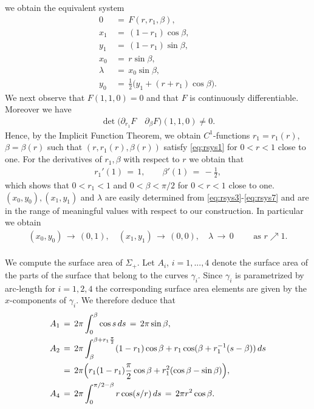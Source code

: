 \documentclass[reqno,makeidx,12pt]{amsart}
\theoremstyle{note}
\theoremstyle{definition}
\begin{document}
we obtain the equivalent system
\begin{align}
  0\,&=\, F(r,r_1,\beta), \label{eq:rsys1}\\
  x_1\,&=\, (1-r_1)\cos\beta, \label{eq:rsys3}\\
  y_1\,&=\, (1-r_1)\sin\beta, \label{eq:rsys4}\\
  x_0\,&=\, r\sin\beta, \label{eq:rsys5}\\
  \lambda\,&=\, x_0\sin\beta, \label{eq:rsys6}\\
  y_0\,&=\,\frac{1}{2}\Big(y_1 + (r+r_1)\cos\beta\Big). \label{eq:rsys7}
\end{align}
We next observe that $F(1,1,0)=0$ and that $F$ is continuously
differentiable. Moreover we have
\begin{gather*}
  \det \Big(\partial_{r_1}F\quad \partial_\beta F\Big)(1,1,0)\neq 0.
\end{gather*}
Hence, by the Implicit Function Theorem, we obtain $C^1$-functions $r_1=r_1(r)$,
$\beta=\beta(r)$ such that $(r,r_1(r),\beta(r))$ satisfy
\eqref{eq:rsys1} for $0<r<1$ close to one. 
For the derivatives of $r_1,\beta$ with respect to $r$ we obtain that
\begin{gather}
   r_1'(1) \,=\, 1, \qquad \beta'(1)\,=\,
   -\frac{1}{2}, \label{eq:prime-r}
\end{gather}
which shows that $0<r_1<1$ and $0<\beta<\pi/2$ for $0<r<1$ close to
one. $(x_0,y_0),(x_1,y_1)$ and $\lambda$ are easily determined from
\eqref{eq:rsys3}-\eqref{eq:rsys7} and are in the range of meaningful
values with respect to our construction. In particular we obtain
\begin{gather}
  (x_0,y_0)\,\to\, (0,1), \quad (x_1,y_1)\,\to\, (0,0), \quad
  \lambda\,\to\, 0 \qquad\text{ as }r\nearrow 1. \label{eq:lim-x0y0}
\end{gather}
{\mbox{}\\\underline{}}
We compute the surface area of $\Sigma_+$. Let $A_i$, $i=1,...,4$ denote 
the surface area of the parts of the surface that belong to the curves
$\gamma_i$.
Since $\gamma_i$ is parametrized by arc-length for $i=1,2,4$ the
corresponding surface area elements are given by the $x$-components of
$\gamma_i$. We therefore deduce that
\begin{align}
  A_1\,&=\, 2\pi \int_0^\beta \cos s\,ds \,=\, 2\pi \sin
  \beta, \label{eq:A1}\\
  A_2\,&=\, 2\pi \int_\beta^{\beta+r_1\frac{\pi}{2}} (1-r_1)\cos\beta +
  r_1\cos(\beta +r_1^{-1}(s-\beta))\, ds \notag\\
  &=\,
  2\pi\Big(r_1(1-r_1)\frac{\pi}{2}\cos\beta + r_1^2(\cos \beta
  -\sin\beta)\Big), \label{eq:A2}\\
  A_4\,&=\, 2\pi\int_0^{\pi/2-\beta} r\cos(s/r)\,ds\,=\, 2\pi r^2
  \cos\beta.   \label{eq:A4}
\end{align}
\end{document}

